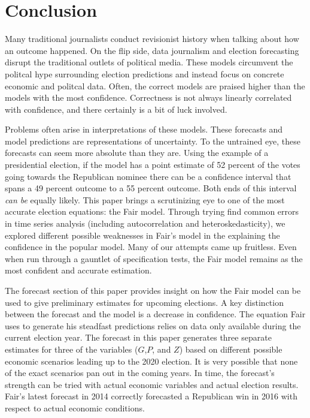 \documentclass[11,]{article}
\begin{document}
\hypertarget{conclusion}{%
\section{Conclusion}\label{conclusion}}

Many traditional journalists conduct revisionist history when talking
about how an outcome happened. On the flip side, data journalism and
election forecasting disrupt the traditional outlets of political media.
These models circumvent the politcal hype surrounding election
predictions and instead focus on concrete economic and politcal data.
Often, the correct models are praised higher than the models with the
most confidence. Correctness is not always linearly correlated with
confidence, and there certainly is a bit of luck involved.

Problems often arise in interpretations of these models. These forecasts
and model predictions are representations of uncertainty. To the
untrained eye, these forecasts can seem more absolute than they are.
Using the example of a presidential election, if the model has a point
estimate of 52 percent of the votes going towards the Republican nominee
there can be a confidence interval that spans a 49 percent outcome to a
55 percent outcome. Both ends of this interval \emph{can be} equally
likely. This paper brings a scrutinizing eye to one of the most accurate
election equations: the Fair model. Through trying find common errors in
time series analysis (including autocorrelation and heteroskedasticity),
we explored different possible weaknesses in Fair's model in the
explaining the confidence in the popular model. Many of our attempts
came up fruitless. Even when run through a gauntlet of specification
tests, the Fair model remains as the most confident and accurate
estimation.

The forecast section of this paper provides insight on how the Fair
model can be used to give preliminary estimates for upcoming elections.
A key distinction between the forecast and the model is a decrease in
confidence. The equation Fair uses to generate his steadfast predictions
relies on data only available during the current election year. The
forecast in this paper generates three separate estimates for three of
the variables (\(G\),\(P\), and \(Z\)) based on different possible
economic scenarios leading up to the 2020 election. It is very possible
that none of the exact scenarios pan out in the coming years. In time,
the forecast's strength can be tried with actual economic variables and
actual election results. Fair's latest forecast in 2014 correctly
forecasted a Republican win in 2016 with respect to actual economic
conditions.
\end{document}
